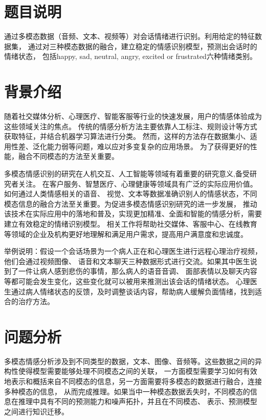 \documentclass[11pt]{article}
\begin{document}
\newpage
\tableofcontents

\newpage


    \section{题目说明}
    通过多模态数据（音频、文本、视频等）对会话情绪进行识别。利用给定的特征数据集，
    通过对三种模态数据的融合，建立稳定的情感识别模型，预测出会话时的情绪状态，
    包括happy, sad, neutral, angry, excited or frustrated六种情绪类别。


    \section{背景介绍}
    随着社交媒体分析、心理医疗、智能客服等行业的快速发展，用户的情感体验成为这些领域关注的焦点。
    传统的情感分析方法主要依靠人工标注、规则设计等方式获取特征，并结合机器学习算法进行分类。
    然而，这样的方法存在数据集小、适用性差、泛化能力弱等问题，难以应对多变复杂的应用场景。
    为了获得更好的性能，融合不同模态的方法至关重要。

    多模态情感识别的研究在人机交互、人工智能等领域有着重要的研究意义,备受研究者关注。
    在客户服务、智慧医疗、心理健康等领域具有广泛的实际应用价值。如何通过人类情感相关的语音、
    视觉、文本等数据准确识别人的情感状态，不同模态信息的融合方法至关重要。为促进多模态情感识别研究的进一步发展，
    推动该技术在实际应用中的落地和普及，实现更加精准、全面和智能的情感分析，需要建立有效稳定的情绪识别模型。
    相关工作将帮助社交媒体、客服中心、在线教育等领域的企业及机构更好地理解和满足用户需求，提高用户满意度和忠诚度。

    举例说明：假设一个会话场景为一个病人正在和心理医生进行远程心理治疗视频，他们会通过视频图像、
    语音和文本聊天三种数据形式进行交流。如果其中医生说到了一件让病人感到悲伤的事情，那么病人的语音音调、
    面部表情以及聊天内容等都可能会发生变化，这些变化就可以被用来推测出该会话的情绪状态。
    心理医生通过病人情绪状态的反馈，及时调整谈话内容，帮助病人缓解负面情绪，找到适合的治疗方法。


    \section{问题分析}
    多模态情感分析涉及到不同类型的数据，文本、图像、音频等。这些数据之间的异构性使得模型需要能够处理不同模态之间的关联，
    一方面模型需要学习如何有效地表示和概括来自不同模态的信息，另一方面需要将多模态的数据进行融合，连接多种模态的信息，
    从而完成推理。如果当中一种模态数据丢失时，不同模态的信息在推理中具有不同的预测能力和噪声拓扑，并且在不同模态、
    表示、预测模型之间进行知识迁移。
\end{document}
